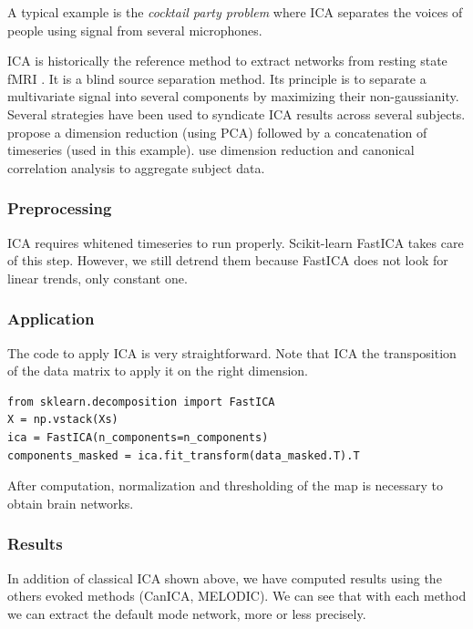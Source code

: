 \documentclass{frontiersSCNS} %
\begin{document}
A typical example is the \emph{cocktail party problem} where ICA separates the
voices of people using signal from several microphones.

ICA is historically the reference method to extract networks from resting state
fMRI \cite{biswal1999}. It is a blind source separation method. Its principle is
to separate a
multivariate signal into several components by maximizing their non-gaussianity.
Several strategies have been used to syndicate ICA
results across several subjects. \cite{calhoun2001a} propose a dimension
reduction (using PCA) followed by a concatenation of timeseries (used in this
example).
\cite{varoquaux2010} use dimension reduction and canonical correlation analysis
to aggregate subject data.

\subsubsection{Preprocessing}

ICA requires whitened timeseries to run properly. Scikit-learn FastICA takes care
of this step. However, we still detrend them because
FastICA does not look for linear trends, only constant one.

\subsubsection{Application}


The code to apply ICA is very straightforward. Note that ICA 
the transposition of the data
matrix to apply it on the right dimension.

\begin{lstlisting}
from sklearn.decomposition import FastICA
X = np.vstack(Xs)
ica = FastICA(n_components=n_components)
components_masked = ica.fit_transform(data_masked.T).T
\end{lstlisting}

After computation, normalization and thresholding of the map is necessary to
obtain brain networks.

\subsubsection{Results}

In addition of classical ICA shown above, we have computed results using the
others evoked methods (CanICA, MELODIC). We can see that with each method we can
extract the default mode network, more or less precisely.
\end{document}
